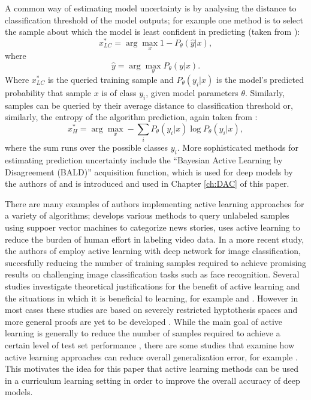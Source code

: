 A common way of estimating model uncertainty is by analysing the distance to classification threshold of the model outputs; for example one method is to select the sample about which the model is least confident in predicting (taken from \cite{settles2012active}):
\begin{equation}
x^{*}_{LC} = \arg\max_{x} 1 - P_{\theta}(\hat{y}|x),
\end{equation}
where
\begin{equation}
\hat{y} = \arg\max_{y}P_{\theta}(y|x).
\end{equation}
Where $x^{*}_{LC}$ is the queried training sample and $P_{\theta}(y_{i}|x)$ is the model's predicted probability that sample $x$ is of class $y_{i}$, given model parameters $\theta$. Similarly, samples can be queried by their average distance to classification threshold or, similarly, the entropy of the algorithm prediction, again taken from \cite{settles2012active}:
\begin{equation}
x^{*}_{H} = \arg\max_{x} - \sum_{i} P_{\theta}(y_i|x)\log P_{\theta}(y_i|x),
\end{equation}
where the sum runs over the possible classes $y_i$. More sophisticated methods for estimating prediction uncertainty include the ``Bayesian Active Learning by Disagreement (BALD)'' \cite{houlsby2011bayesian} acquisition function, which is used for deep models by the authors of \cite{gal2017deep} and is introduced and used in Chapter \ref{ch:DAC} of this paper.

There are many examples of authors implementing active learning approaches for a variety of algorithms; \cite{tong2001support} develops various methods to query unlabeled samples using suppoer vector machines to categorize news stories, \cite{yang2003automatically} uses active learning to reduce the burden of human effort in labeling video data. In a more recent study, the authors of \cite{wang2017cost} employ active learning with deep network for image classification, succesfully reducing the number of training samples required to achieve promising results on challenging image classification tasks such as face recognition. Several  studies investigate theoretical justifications for the benefit of active learning and the situations in which it is beneficial to learning, for example \cite{balcan2006agnostic} and \cite{balcan2010true}. However in most cases these studies are based on severely restricted hyptothesis spaces and more general proofs are yet to be developed \cite{settles2012active}. While the main goal of active learning is generally to reduce the number of samples required to achieve a certain level of test set performance \cite{settles2012active}, there are some studies that examine how active learning approaches can reduce overall generalization error, for example \cite{cohn1994improving}. This motivates the idea for this paper that active learning methods can be used in a curriculum learning setting in order to improve the overall accuracy of deep models. 

